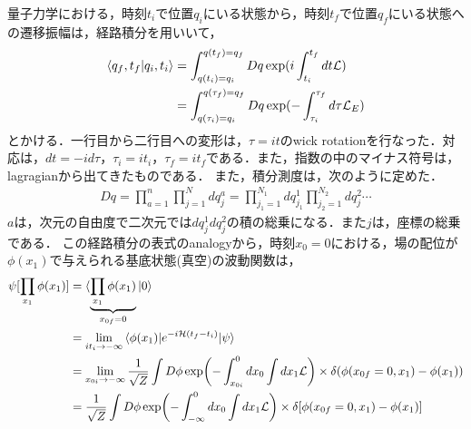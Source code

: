 量子力学における，時刻$t_i$で位置$q_i$にいる状態から，時刻$t_f$で位置$q_f$にいる状態への遷移振幅は，経路積分を用いいて，
\begin{align}
  \braket{q_f,t_f|q_i,t_i}&=\int^{q(t_f)=q_f}_{q(t_i)=q_i}Dq \exp(i\int^{t_f}_{t_i}dt\mathcal{L})\\
  &=\int^{q(\tau_f)=q_f}_{q(\tau_i)=q_i}Dq \exp(-\int^{\tau_f}_{\tau_i}d\tau\mathcal{L}_{E})
\end{align}
とかける．一行目から二行目への変形は，$\tau=it$のwick rotationを行なった．対応は，$dt=-id\tau$，$\tau_i=it_i$，$\tau_f=it_f$である．また，指数の中のマイナス符号は，lagragianから出てきたものである．
また，積分測度は，次のように定めた．
\begin{align}
  Dq=\prod_{a=1}^{n}\prod_{j=1}^{N}dq_{j}^a=\prod_{j_1=1}^{N_1}dq_{j_1}^1\prod_{j_2=1}^{N_2}dq_{j}^2\cdots
\end{align}
$a$は，次元の自由度で二次元では$dq_{j}^1 dq_{j}^2$の積の総乗になる．また$j$は，座標の総乗である．
この経路積分の表式のanalogyから，時刻$x_0=0$における，場の配位が$\phi(x_1)$で与えられる基底状態(真空)の波動関数は，
\begin{align}
  \psi[\prod_{x_1}\phi(x_{1})]&=\braket{\underbrace{\prod_{x_1}\phi(x_1)}_{x_{0f}=0}|0} \\
  \label{a}
  &=\lim_{it_i\to -\infty}\braket{\phi(x_1)|e^{-i\mathcal
  {H}(t_f-t_i)}|\psi}\\
  &=\lim_{x_{0i}\to -\infty}\frac{1}{\sqrt{Z}} \int D\phi \exp\biggl(-\int^{0}_{x_{0i}}dx_0\int dx_1\mathcal{L}\biggr)\times\delta(\phi(x_{0f}=0,x_1)-\phi(x_1))\\
  \label{b}
  &=\frac{1}{\sqrt{Z}} \int D\phi \exp\biggl(-\int^{0}_{-\infty}dx_0\int dx_1\mathcal{L}\biggr)\times\delta[\phi(x_{0f}=0,x_1)-\phi(x_1)]
\end{align}
